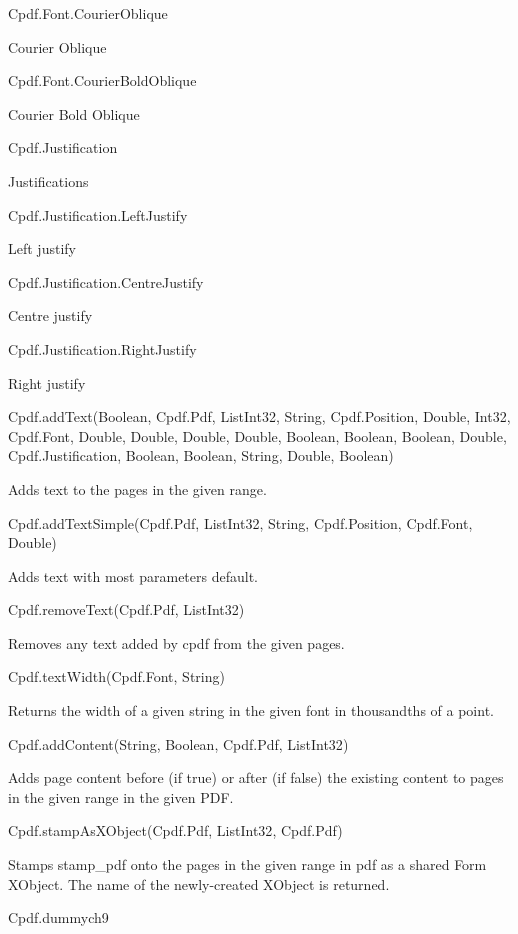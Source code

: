 Cpdf.Font.CourierOblique

Courier Oblique

Cpdf.Font.CourierBoldOblique

Courier Bold Oblique

Cpdf.Justification

Justifications

Cpdf.Justification.LeftJustify

Left justify

Cpdf.Justification.CentreJustify

Centre justify

Cpdf.Justification.RightJustify

Right justify

Cpdf.addText(Boolean, Cpdf.Pdf, List{Int32}, String, Cpdf.Position, Double, Int32, Cpdf.Font, Double, Double, Double, Double, Boolean, Boolean, Boolean, Double, Cpdf.Justification, Boolean, Boolean, String, Double, Boolean)


Adds text to the pages in the given range.


Cpdf.addTextSimple(Cpdf.Pdf, List{Int32}, String, Cpdf.Position, Cpdf.Font, Double)


Adds text with most parameters default.


Cpdf.removeText(Cpdf.Pdf, List{Int32})


Removes any text added by cpdf from the
given pages.


Cpdf.textWidth(Cpdf.Font, String)


Returns the width of a given string in the given font in thousandths of a
point.


Cpdf.addContent(String, Boolean, Cpdf.Pdf, List{Int32})


Adds page content before (if
true) or after (if false) the existing content to pages in the given range
in the given PDF.


Cpdf.stampAsXObject(Cpdf.Pdf, List{Int32}, Cpdf.Pdf)


Stamps stamp_pdf onto the pages
in the given range in pdf as a shared Form XObject. The name of the
newly-created XObject is returned.


Cpdf.dummych9

